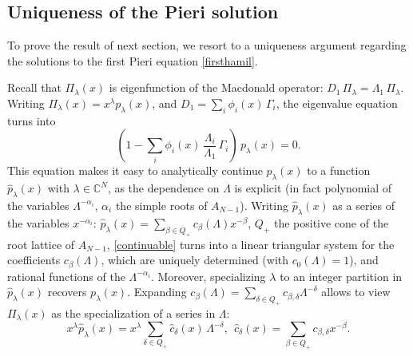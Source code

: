 \documentclass[12pt]{amsart}
\newcommand{\C}{{\mathbb C}}
\newcommand{\al}{{\alpha}}
\newcommand{\lL}{{\Lambda}}
\numberwithin{equation}{section}
\begin{document}
%
%
%
%
%
%
%
%
%
%
%
%
%
%
\subsection{Uniqueness of the Pieri solution}\label{sec:unique}
To prove the result of next section, we resort to a uniqueness argument regarding the solutions to the first Pieri equation
\eqref{firsthamil}.

Recall that $\Pi_\lambda(x)$ is eigenfunction
of the Macdonald operator: $D_1\,\Pi_\lambda= \lL_1\, \Pi_\lambda$. Writing $\Pi_\lambda(x)=x^\lambda p_\lambda(x)$,
and $D_1=\sum_{i} \phi_{i}(x) \,\Gamma_i$, the eigenvalue equation turns into
\begin{equation}\label{continuable}
(1-\sum_{i} \phi_{i}(x) \,\frac{\lL_i}{\lL_1} \, \Gamma_i)\,p_\lambda(x)=0 .
\end{equation}
This equation makes it easy to analytically continue 
$p_\lambda(x)$ to a function $\hat p_\lambda(x)$ with $\lambda\in \C^N$,
as the dependence on $\lL$ is explicit (in fact polynomial of the variables $\lL^{-\al_i}$, $\al_i$ the simple roots of $A_{N-1}$).  
Writing $\hat p_\lambda(x)$
as a series of the variables $x^{-\al_i}$: $\hat p_\lambda(x)=\sum_{\beta\in Q_+}
c_\beta(\lL) x^{-\beta}$, $Q_+$ the positive cone of the root lattice of $A_{N-1}$, 
\eqref{continuable} turns into a linear triangular system for the coefficients $c_\beta(\lL)$,
which are uniquely determined (with  $c_0(\lL)=1$), and rational functions of the $\lL^{-\al_i}$. 
Moreover, specializing $\lambda$ to an integer partition in $\hat p_\lambda(x)$ recovers $p_\lambda(x)$. 
Expanding $c_\beta(\lL)=\sum_{\delta\in Q_+} c_{\beta,\delta} \lL^{-\delta}$ allows to view $\Pi_\lambda(x)$ as the specialization of a series in $\lL$: 
$$x^\lambda \hat p_\lambda(x)=x^\lambda \sum_{\delta\in Q_+} \hat c_\delta(x)\, \lL^{-\delta},\ \ 
\hat c_\delta(x)=\sum_{\beta\in Q_+} c_{\beta,\delta} x^{-\beta} .$$
\end{document}
